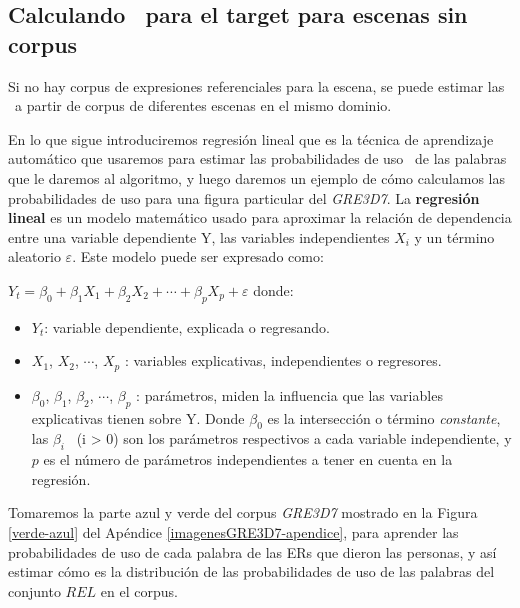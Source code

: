 \subsection{Calculando \puse\ para el target para escenas sin corpus } 
\label{subsec:learning}

%


Si no hay corpus de expresiones referenciales para la escena, se puede estimar las \puse~a partir de corpus de
diferentes escenas en el mismo dominio.

En lo que sigue introduciremos regresi\'on lineal que es la t\'ecnica de aprendizaje autom\'atico que usaremos para estimar las probabilidades de uso \puse\ de las palabras que le daremos al algoritmo, y luego daremos un ejemplo de c\'omo calculamos las probabilidades de uso para una figura particular del \textit{GRE3D7}. La \textbf{regresi\'on lineal} es un modelo matem\'atico usado para aproximar la relaci\'on de dependencia entre una variable dependiente Y, las variables independientes $X_i$ y un t\'ermino aleatorio $\varepsilon$. Este modelo puede ser expresado como:

    $Y_t = \beta_0 + \beta_1 X_1 + \beta_2 X_2 + \cdots +\beta_p X_p + \varepsilon$ donde:
\begin{itemize}
    \item $Y_t$: variable dependiente, explicada o regresando.
    \item $X_1$, $X_2$, $\cdots$, $X_p$ : variables explicativas, independientes o regresores.
    \item $\beta_0$, $\beta_1$, $\beta_2$, $\cdots$, $\beta_p$ : par\'ametros, miden la influencia que las variables explicativas tienen sobre Y. Donde $\beta_0$ es la intersecci\'on o t\'ermino {\it constante}, las $\beta_i$ \ (i > 0) son los par\'ametros respectivos a cada variable independiente, y $p$ es el n\'umero de par\'ametros independientes a tener en cuenta en la regresi\'on.
\end{itemize}
Tomaremos la parte azul y verde del corpus \textit{GRE3D7} mostrado en la Figura \ref{verde-azul} del Ap\'endice \ref{imagenesGRE3D7-apendice}, para aprender las probabilidades de uso de cada palabra de las ERs que dieron las personas, y as\'i estimar c\'omo es la distribuci\'on de las probabilidades de uso de las palabras del conjunto $REL$ en el corpus.

